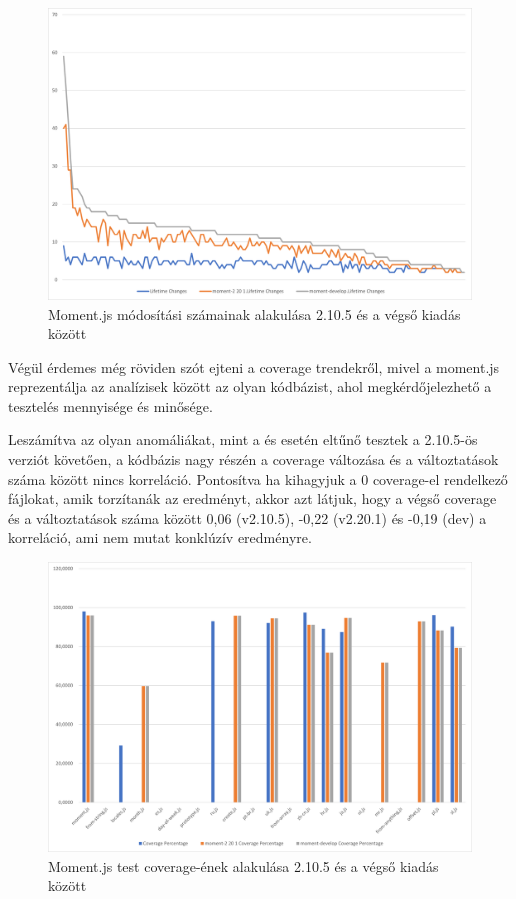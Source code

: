 \begin{figure}[H]
    \centering
    \includegraphics[width=1\textwidth]{images/moment/moment-all-changes.png}
    \caption{Moment.js módosítási számainak alakulása 2.10.5 és a végső kiadás között}
    \label{fig:moment-all-changes}
\end{figure}

Végül érdemes még röviden szót ejteni a coverage trendekről, mivel a moment.js reprezentálja az analízisek között az olyan kódbázist, ahol megkérdőjelezhető a tesztelés mennyisége és minősége.

Leszámítva az olyan anomáliákat, mint a  és  esetén eltűnő tesztek a 2.10.5-ös verziót követően, a kódbázis nagy részén a coverage változása és a változtatások száma között nincs korreláció. Pontosítva ha kihagyjuk a 0 coverage-el rendelkező fájlokat, amik torzítanák az eredményt, akkor azt látjuk, hogy a végső coverage és a változtatások száma között 0,06 (v2.10.5), -0,22 (v2.20.1) és -0,19 (dev) a korreláció, ami nem mutat konklúzív eredményre.

\begin{figure}[H]
    \centering
    \includegraphics[width=1\textwidth]{images/moment/moment-all-coverage.png}
    \caption{Moment.js test coverage-ének alakulása 2.10.5 és a végső kiadás között}
    \label{fig:moment-all-coverage}
\end{figure}

